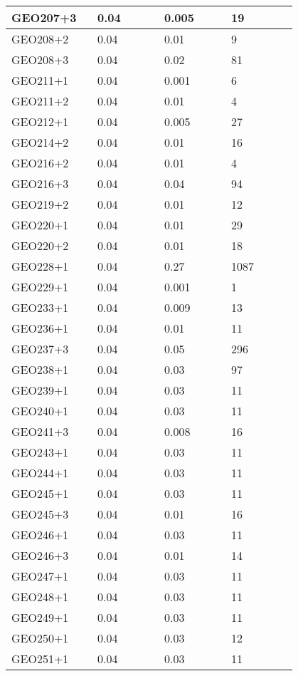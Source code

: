\begin{longtable}[H]{|p{0.2\linewidth}|p{0.2\linewidth}|p{0.2\linewidth}|p{0.2\linewidth}|}
\hline
GEO207+3 &  0.04 &  0.005 &  19 \\
\hline
GEO208+2 &  0.04 &  0.01 &  9 \\
\hline
GEO208+3 &  0.04 &  0.02 &  81 \\
\hline
GEO211+1 &  0.04 &  0.001 &  6 \\
\hline
GEO211+2 &  0.04 &  0.01 &  4 \\
\hline
GEO212+1 &  0.04 &  0.005 &  27 \\
\hline
GEO214+2 &  0.04 &  0.01 &  16 \\
\hline
GEO216+2 &  0.04 &  0.01 &  4 \\
\hline
GEO216+3 &  0.04 &  0.04 &  94 \\
\hline
GEO219+2 &  0.04 &  0.01 &  12 \\
\hline
GEO220+1 &  0.04 &  0.01 &  29 \\
\hline
GEO220+2 &  0.04 &  0.01 &  18 \\
\hline
GEO228+1 &  0.04 &  0.27 &  1087 \\
\hline
GEO229+1 &  0.04 &  0.001 &  1 \\
\hline
GEO233+1 &  0.04 &  0.009 &  13 \\
\hline
GEO236+1 &  0.04 &  0.01 &  11 \\
\hline
GEO237+3 &  0.04 &  0.05 &  296 \\
\hline
GEO238+1 &  0.04 &  0.03 &  97 \\
\hline
GEO239+1 &  0.04 &  0.03 &  11 \\
\hline
GEO240+1 &  0.04 &  0.03 &  11 \\
\hline
GEO241+3 &  0.04 &  0.008 &  16 \\
\hline
GEO243+1 &  0.04 &  0.03 &  11 \\
\hline
GEO244+1 &  0.04 &  0.03 &  11 \\
\hline
GEO245+1 &  0.04 &  0.03 &  11 \\
\hline
GEO245+3 &  0.04 &  0.01 &  16 \\
\hline
GEO246+1 &  0.04 &  0.03 &  11 \\
\hline
GEO246+3 &  0.04 &  0.01 &  14 \\
\hline
GEO247+1 &  0.04 &  0.03 &  11 \\
\hline
GEO248+1 &  0.04 &  0.03 &  11 \\
\hline
GEO249+1 &  0.04 &  0.03 &  11 \\
\hline
GEO250+1 &  0.04 &  0.03 &  12 \\
\hline
GEO251+1 &  0.04 &  0.03 &  11 \\
\hline

\end{longtable}
